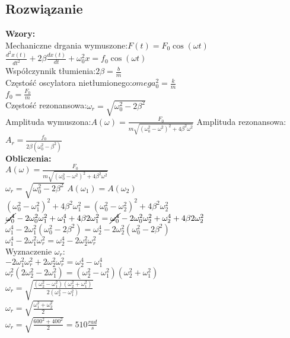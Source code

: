\documentclass[a4paper,14pt]{extarticle}  %
\begin{document}
            \subsection{Rozwiązanie}
                \textbf{Wzory:}\\
                Mechaniczne drgania wymuszone:$F(t)=F_0\cos(\omega t)$\\
                $\frac{d^2x(t)}{dt^2}+2\beta\frac{dx(t)}{dt}+\omega_0^2x=f_0\cos(\omega t)$\\
                Współczynnik tłumienia:$2\beta=\frac{b}{m}$\\
                Częstość oscylatora nietłumionego:$omega_0^2=\frac{k}{m}$\\
                $f_0=\frac{F_0}{m}$\\
                Częstość rezonansowa:$\omega_r=\sqrt{\omega_0^2-2\beta^2}$\\
                Amplituda wymuszona:$A(\omega)=\frac{F_0}{m\sqrt{(\omega_0^2-\omega^2)^2+4\beta^2\omega^2}}$
                Amplituda rezonansowa:$A_r=\frac{f_0}{2\beta(\omega_0^2-\beta^2)}$\\
                \textbf{Obliczenia:}\\
                $A(\omega)=\frac{F_0}{m\sqrt{(\omega_0^2-\omega^2)^2+4\beta^2\omega^2}}$\\
                $\omega_r=\sqrt{\omega_0^2-2\beta^2}$    $A(\omega_1)=A(\omega_2)$\\
                $(\omega_0^2-\omega_1^2)^2+4\beta^2\omega_1^2=(\omega_0^2-\omega_2^2)^2+4\beta^2\omega_2^2$\\
                $\cancel{\omega^4_0}-2\omega^2_0\omega^2_1+\omega^4_1+4\beta2\omega^2_1=\cancel{\omega^4_0}-2\omega^2_0\omega^2_2+\omega^4_2+4\beta2\omega^2_2$\\
                $\omega^4_1-2\omega^2_1(\omega^2_0-2\beta^2)=\omega^4_2-2\omega^2_2(\omega^2_0-2\beta^2)$\\
                $\omega^4_1-2\omega^2_1\omega^2_r=\omega^4_2-2\omega^2_2\omega^2_r$\\
                Wyznaczenie $\omega_r$:\\
                $-2\omega^2_1\omega^2_r+2\omega^2_2\omega^2_r=\omega^4_2-\omega^4_1$\\
                $\omega^2_r(2\omega^2_2-2\omega^2_1)=(\omega^2_2-\omega^2_1)(\omega^2_2+\omega^2_1)$\\
                $\omega_r=\sqrt{\frac{(\omega^2_2-\omega^2_1)(\omega^2_2+\omega^2_1)}{2(\omega^2_2-\omega^2_1)}}$\\
                $\omega_r=\sqrt{\frac{\omega^2_1+\omega^2_2}{2}}$\\
                $\omega_r=\sqrt{\frac{600^2+400^2}{2}}=510\frac{rad}{s}$\\
\clearpage
\end{document}
